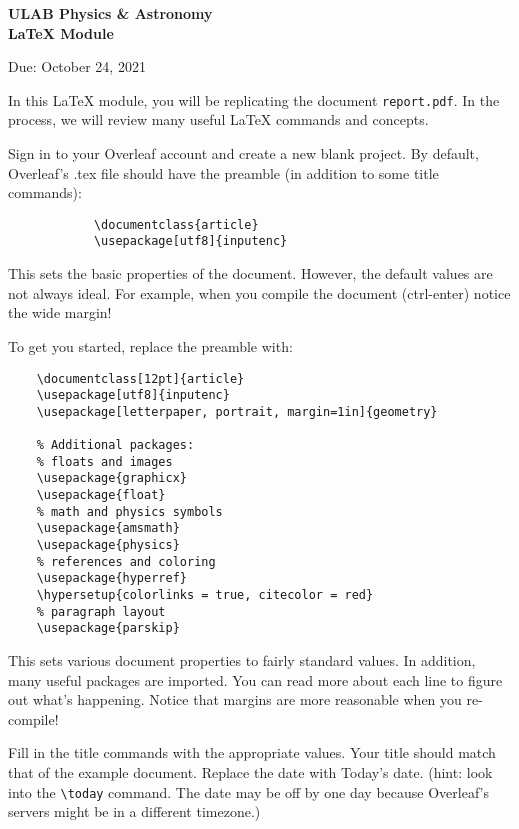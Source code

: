 \documentclass[addpoints,12pt]{exam}
\numberwithin{equation}{section}
\begin{document}
	
	\begin{center}
		\textbf{\Large{ULAB Physics \& Astronomy\\LaTeX Module}}
	\end{center}
	\begin{center}
		Due: October 24, 2021
	\end{center}
	
	In this LaTeX module, you will be replicating the document \verb|report.pdf|. In the process, we will review many useful LaTeX commands and concepts.
	
	\begin{questions}
		
		\question[10] Sign in to your Overleaf account and create a new blank project. By default, Overleaf's .tex file should have the preamble (in addition to some title commands):
		\begin{verbatim}
		    \documentclass{article}
		    \usepackage[utf8]{inputenc}
		\end{verbatim}
		This sets the basic properties of the document. However, the default values are not always ideal. For example, when you compile the document (ctrl-enter) notice the wide margin!
		
		To get you started, replace the preamble with:
		\begin{verbatim}
    \documentclass[12pt]{article}
    \usepackage[utf8]{inputenc}
    \usepackage[letterpaper, portrait, margin=1in]{geometry}
    
    % Additional packages:
    % floats and images
    \usepackage{graphicx}
    \usepackage{float}
    % math and physics symbols
    \usepackage{amsmath}
    \usepackage{physics}
    % references and coloring
    \usepackage{hyperref}
    \hypersetup{colorlinks = true, citecolor = red}
    % paragraph layout
    \usepackage{parskip}		
\end{verbatim}

    This sets various document properties to fairly standard values. In addition, many useful packages are imported. You can read more about each line to figure out what's happening. Notice that margins are more reasonable when you re-compile!
		
	\question[10] Fill in the title commands with the appropriate values. Your title should match that of the example document. Replace the date with Today's date. (hint: look into the \verb|\today| command. The date may be off by one day because Overleaf's servers might be in a different timezone.)
	

\end{questions}
\end{document}
